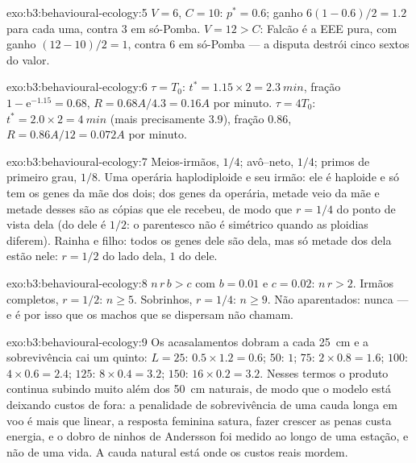 \begin{solution}{exo:b3:behavioural-ecology:5}
$V = 6$, $C = 10$: $p^{*} = 0.6$; ganho $6(1 - 0.6)/2 = 1.2$ para cada
uma, contra $3$ em só-Pomba. $V = 12 > C$: Falcão é a EEE pura, com ganho
$(12 - 10)/2 = 1$, contra $6$ em só-Pomba --- a disputa destrói cinco
sextos do valor.
\end{solution}

\begin{solution}{exo:b3:behavioural-ecology:6}
$\tau = T_{0}$: $t^{*} = 1.15\times 2 = \qty{2.3}{min}$, fração $1 -
\mathrm{e}^{-1.15} = 0.68$, $R = 0.68A/4.3 = 0.16A$ por minuto. $\tau =
4T_{0}$: $t^{*} = 2.0\times 2 = \qty{4}{min}$ (mais precisamente $3.9$),
fração $0.86$, $R = 0.86A/12 = 0.072A$ por minuto.
\end{solution}

\begin{solution}{exo:b3:behavioural-ecology:7}
Meios-irmãos, $1/4$; avô--neto, $1/4$; primos de primeiro grau, $1/8$.
Uma operária haplodiploide e seu irmão: ele é haploide e só tem os genes
da mãe dos dois; dos genes da operária, metade veio da mãe e metade
desses são as cópias que ele recebeu, de modo que $r = 1/4$ do ponto de
vista dela (do dele é $1/2$: o parentesco não é simétrico quando as
ploidias diferem). Rainha e filho: todos os genes dele são dela, mas só
metade dos dela estão nele: $r = 1/2$ do lado dela, $1$ do dele.
\end{solution}

\begin{solution}{exo:b3:behavioural-ecology:8}
$n\,r\,b > c$ com $b = 0.01$ e $c = 0.02$: $n\,r > 2$. Irmãos completos,
$r
= 1/2$: $n \ge 5$. Sobrinhos, $r = 1/4$: $n \ge 9$. Não aparentados:
nunca --- e é por isso que os machos que se dispersam não chamam.
\end{solution}

\begin{solution}{exo:b3:behavioural-ecology:9}
Os acasalamentos dobram a cada \qty{25}{cm} e a sobrevivência cai um
quinto: $L = 25$: $0.5\times 1.2 = 0.6$; $50$: $1$; $75$: $2\times 0.8 = 1.6$; $100$: $4\times 0.6 = 2.4$; $125$: $8\times 0.4 = 3.2$; $150$:
$16\times 0.2 =
3.2$. Nesses termos o produto continua subindo muito além
dos \qty{50}{cm} naturais, de modo que o modelo está deixando custos de
fora: a penalidade de sobrevivência de uma cauda longa em voo é mais que
linear, a resposta feminina satura, fazer crescer as penas custa energia,
e o dobro de ninhos de Andersson foi medido ao longo de uma estação, e
não de uma vida. A cauda natural está onde os custos reais mordem.
\end{solution}


